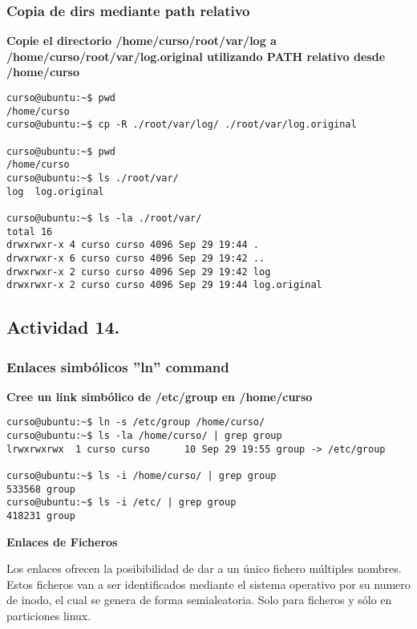 \documentclass[a4paper,11pt,spanish]{article} %
\newenvironment{myscriptlisting}
{\begin{list}{}{\setlength{\leftmargin}{1em}}\item\scriptsize\bfseries}
{\end{list}}
\begin{document}
\subsubsection{Copia de dirs mediante path relativo}
\textbf{Copie el directorio /home/curso/root/var/log a /home/curso/root/var/log.original
utilizando PATH relativo desde /home/curso}

\begin{myscriptlisting}
 \begin{verbatim}
curso@ubuntu:~$ pwd
/home/curso
curso@ubuntu:~$ cp -R ./root/var/log/ ./root/var/log.original

curso@ubuntu:~$ pwd
/home/curso
curso@ubuntu:~$ ls ./root/var/
log  log.original

curso@ubuntu:~$ ls -la ./root/var/
total 16
drwxrwxr-x 4 curso curso 4096 Sep 29 19:44 .
drwxrwxr-x 6 curso curso 4096 Sep 29 19:42 ..
drwxrwxr-x 2 curso curso 4096 Sep 29 19:42 log
drwxrwxr-x 2 curso curso 4096 Sep 29 19:44 log.original
 \end{verbatim}
\end{myscriptlisting}

\subsection{Actividad 14.}

\subsubsection{Enlaces simbólicos ''ln'' command}
\textbf{Cree un link simbólico de /etc/group en /home/curso}

\begin{myscriptlisting}
 \begin{verbatim}
curso@ubuntu:~$ ln -s /etc/group /home/curso/
curso@ubuntu:~$ ls -la /home/curso/ | grep group
lrwxrwxrwx  1 curso curso      10 Sep 29 19:55 group -> /etc/group

curso@ubuntu:~$ ls -i /home/curso/ | grep group 
533568 group
curso@ubuntu:~$ ls -i /etc/ | grep group
418231 group
 \end{verbatim}
\end{myscriptlisting}


\textbf{Enlaces de Ficheros \\}

Los enlaces ofrecen la posibibilidad de dar a un único fichero múltiples nombres. 
Estos ficheros van a ser identificados mediante el sistema operativo por su numero de inodo, 
el cual se genera de forma semialeatoria. Solo para ficheros y sólo en particiones linux.
\end{document}
